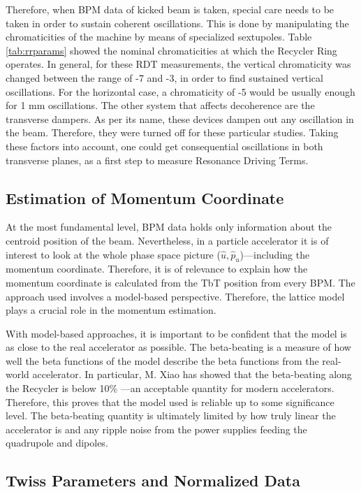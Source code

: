 Therefore, when BPM data of kicked beam is taken, special care needs to be taken in order to sustain coherent oscillations. This is done by manipulating the chromaticities of the machine by means of specialized sextupoles. Table \ref{tab:rrparams} showed the nominal chromaticities at which the Recycler Ring operates. In general, for these RDT measurements, the vertical chromaticity was changed between the range of -7 and -3, in order to find sustained vertical oscillations. For the horizontal case, a chromaticity of -5 would be usually enough for 1 mm oscillations. The other system that affects decoherence are the transverse dampers. As per its name, these devices dampen out any oscillation in the beam. Therefore, they were turned off for these particular studies. Taking these factors into account, one could get consequential oscillations in both transverse planes, as a first step to measure Resonance Driving Terms.      

\subsection{Estimation of Momentum Coordinate}

At the most fundamental level, BPM data holds only information about the centroid position of the beam. Nevertheless, in a particle accelerator it is of interest to look at the whole phase space picture ($\hat{u},\hat{p}_u$)---including the momentum coordinate. Therefore, it is of relevance to explain how the momentum coordinate is calculated from the TbT position from every BPM. The approach used involves a model-based perspective. Therefore, the lattice model plays a crucial role in the momentum estimation. 

With model-based approaches, it is important to be confident that the model is as close to the real accelerator as possible. The beta-beating is a measure of how well the beta functions of the model describe the beta functions from the real-world accelerator. In particular, M. Xiao has showed that the beta-beating along the Recycler is below 10\% \cite{rr3}---an acceptable quantity for modern accelerators. Therefore, this proves that the model used is reliable up to some significance level. The beta-beating quantity is ultimately limited by how truly linear the accelerator is and any ripple noise from the power supplies feeding the quadrupole and dipoles.   

\subsection{Twiss Parameters and Normalized Data}



